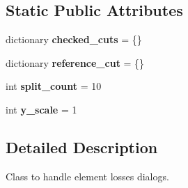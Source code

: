 \subsection*{Static Public Attributes}
\begin{DoxyCompactItemize}
\item 
\hypertarget{classDialogs_1_1ElementLossesDialog_1_1ElementLossesDialog_ad7a3b992570ed3b04ea9548c97ceff21}{dictionary {\bfseries checked\-\_\-cuts} = \{\}}\label{classDialogs_1_1ElementLossesDialog_1_1ElementLossesDialog_ad7a3b992570ed3b04ea9548c97ceff21}

\item 
\hypertarget{classDialogs_1_1ElementLossesDialog_1_1ElementLossesDialog_a4fa302c0f2ef47dab85f41bca5732e69}{dictionary {\bfseries reference\-\_\-cut} = \{\}}\label{classDialogs_1_1ElementLossesDialog_1_1ElementLossesDialog_a4fa302c0f2ef47dab85f41bca5732e69}

\item 
\hypertarget{classDialogs_1_1ElementLossesDialog_1_1ElementLossesDialog_a36fae53a5aca36a1e3d3e276969c8e3c}{int {\bfseries split\-\_\-count} = 10}\label{classDialogs_1_1ElementLossesDialog_1_1ElementLossesDialog_a36fae53a5aca36a1e3d3e276969c8e3c}

\item 
\hypertarget{classDialogs_1_1ElementLossesDialog_1_1ElementLossesDialog_add52a493975a9d085b496f2580e1228e}{int {\bfseries y\-\_\-scale} = 1}\label{classDialogs_1_1ElementLossesDialog_1_1ElementLossesDialog_add52a493975a9d085b496f2580e1228e}

\end{DoxyCompactItemize}


\subsection{Detailed Description}
\begin{DoxyVerb}Class to handle element losses dialogs.
\end{DoxyVerb}
 

